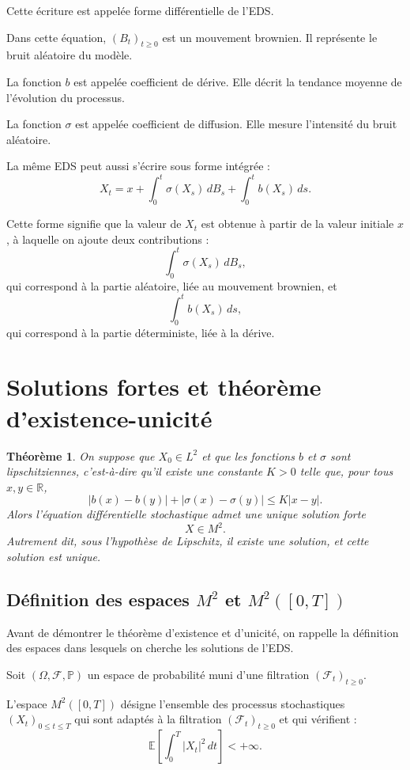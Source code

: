 \documentclass[12pt,a4paper]{article}
\newtheorem{theoreme}{Théorème}
\theoremstyle{remark}
\begin{document}
Cette écriture est appelée forme différentielle de l’EDS.

Dans cette équation, $(B_t)_{t \geq 0}$ est un mouvement brownien. Il représente le bruit aléatoire du modèle.

La fonction $b$ est appelée coefficient de dérive. Elle décrit la tendance moyenne de l’évolution du processus.

La fonction $\sigma$ est appelée coefficient de diffusion. Elle mesure l’intensité du bruit aléatoire.

La même EDS peut aussi s’écrire sous forme intégrée :
\[
X_t
=
x
+
\int_0^t \sigma(X_s)\,dB_s
+
\int_0^t b(X_s)\,ds.
\]

Cette forme signifie que la valeur de $X_t$ est obtenue à partir de la valeur initiale $x$, à laquelle on ajoute deux contributions :
\[
\int_0^t \sigma(X_s)\,dB_s,
\]
qui correspond à la partie aléatoire, liée au mouvement brownien, et
\[
\int_0^t b(X_s)\,ds,
\]
qui correspond à la partie déterministe, liée à la dérive.

\section{Solutions fortes et théorème d’existence-unicité}

\begin{theoreme}
On suppose que $X_0 \in L^2$ et que les fonctions $b$ et $\sigma$ sont lipschitziennes, c’est-à-dire qu’il existe une constante $K>0$ telle que, pour tous $x,y \in \mathbb{R}$,
\[
|b(x)-b(y)| + |\sigma(x)-\sigma(y)|
\leq K|x-y|.
\]
Alors l’équation différentielle stochastique admet une unique solution forte
\[
X \in M^2.
\]
Autrement dit, sous l’hypothèse de Lipschitz, il existe une solution, et cette solution est unique.
\end{theoreme}

\subsection{Définition des espaces $M^2$ et $M^2([0,T])$}

Avant de démontrer le théorème d’existence et d’unicité, on rappelle la définition des espaces dans lesquels on cherche les solutions de l’EDS.

Soit $(\Omega,\mathcal{F},\mathbb{P})$ un espace de probabilité muni d’une filtration $(\mathcal{F}_t)_{t\geq 0}$.

L’espace $M^2([0,T])$ désigne l’ensemble des processus stochastiques $(X_t)_{0\leq t \leq T}$ qui sont adaptés à la filtration $(\mathcal{F}_t)_{t\geq 0}$ et qui vérifient :
\[
\mathbb{E}\left[\int_0^T |X_t|^2\,dt\right] < +\infty.
\]
\end{document}
